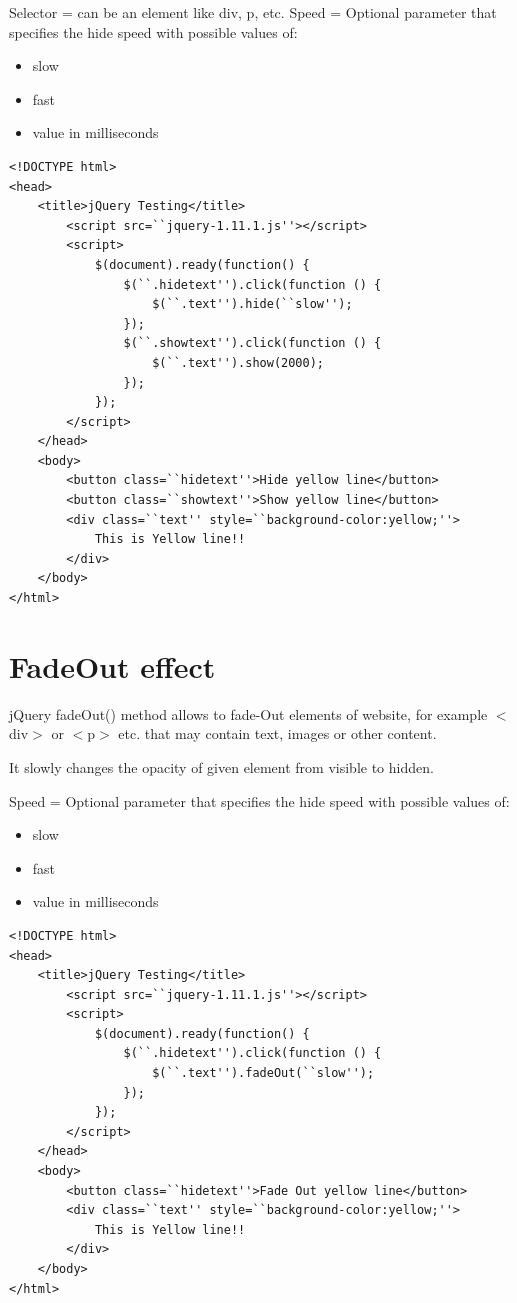 \documentclass[11pt,a4paper]{article}
\begin{document}
Selector = can be an element like div, p, etc.
Speed = Optional parameter that specifies the hide speed with possible values of:
\begin{itemize}
 \item slow
 \item fast
 \item value in milliseconds
\end{itemize}
\begin{lstlisting}
<!DOCTYPE html>
<head>
    <title>jQuery Testing</title>
        <script src=``jquery-1.11.1.js''></script>
        <script>
            $(document).ready(function() {
                $(``.hidetext'').click(function () {
                    $(``.text'').hide(``slow'');
                });
                $(``.showtext'').click(function () {
                    $(``.text'').show(2000);
                });
            });
        </script>
    </head>
    <body>
        <button class=``hidetext''>Hide yellow line</button>
        <button class=``showtext''>Show yellow line</button>
        <div class=``text'' style=``background-color:yellow;''>
            This is Yellow line!!
        </div>
    </body>
</html>
\end{lstlisting}

\section*{FadeOut effect}
jQuery fadeOut() method allows to fade-Out elements of website, for example $<$div$>$ or $<$p$>$ etc. that may contain text, images or other content.

It slowly changes the opacity of given element from visible to hidden.

Speed = Optional parameter that specifies the hide speed with possible values of:
\begin{itemize}
 \item slow
 \item fast
 \item value in milliseconds
\end{itemize}

\begin{lstlisting}
<!DOCTYPE html>
<head>
    <title>jQuery Testing</title>
        <script src=``jquery-1.11.1.js''></script>
        <script>
            $(document).ready(function() {
                $(``.hidetext'').click(function () {
                    $(``.text'').fadeOut(``slow'');
                });
            });  
        </script>
    </head>
    <body>
        <button class=``hidetext''>Fade Out yellow line</button>
        <div class=``text'' style=``background-color:yellow;''>
            This is Yellow line!!
        </div>
    </body>
</html>
\end{lstlisting}
\end{document}
